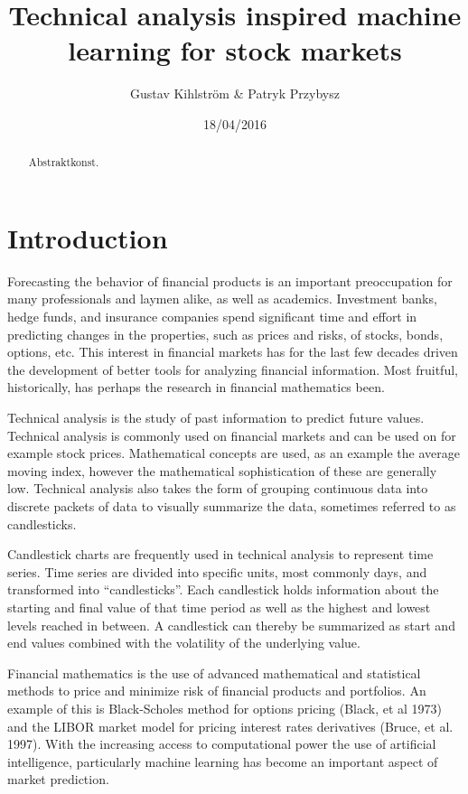 \documentclass{article}
\begin{document}
\title{Technical analysis inspired machine learning for stock markets}
\author{Gustav Kihlström \& Patryk Przybysz}
\date{18/04/2016}
\maketitle
\newpage

\begin{abstract}
Abstraktkonst.
\end{abstract}
\newpage

\tableofcontents
\newpage

\section{Introduction}
Forecasting the behavior of financial products is an important preoccupation for many professionals and laymen alike, as well as academics. Investment banks, hedge funds, and insurance companies spend significant time and effort in predicting changes in the properties, such as prices and risks, of stocks, bonds, options, etc. This interest in financial markets has for the last few decades driven the development of better tools for analyzing financial information. Most fruitful, historically, has perhaps the research in financial mathematics been. 

Technical analysis is the study of past information to predict future values. Technical analysis is commonly used on financial markets and can be used on for example stock prices. Mathematical concepts are used, as an example the average moving index, however the mathematical sophistication of these are generally low. Technical analysis also takes the form of grouping continuous data into discrete packets of data to visually summarize the data, sometimes referred to as candlesticks.

Candlestick charts are frequently used in technical analysis to represent time series. Time series are divided into specific units, most commonly days, and transformed into “candlesticks”. Each candlestick holds information about the starting and final value of that time period as well as the highest and lowest levels reached in between. A candlestick can thereby be summarized as start and end values combined with the volatility of the underlying value.

Financial mathematics is the use of advanced mathematical and statistical methods to price and minimize risk of financial products and portfolios. An example of this is Black-Scholes method for options pricing (Black, et al 1973) and the LIBOR market model for pricing interest rates derivatives (Bruce, et al. 1997). With the increasing access to computational power the use of artificial intelligence, particularly machine learning has become an important aspect of market prediction. 
\end{document}
